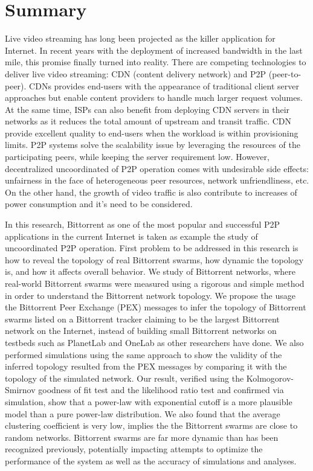 
\chapter*{Summary}

Live video streaming has long been projected as the killer application for Internet.  
In recent years with the deployment of increased bandwidth in the last mile, this promise finally turned into reality.
There are competing technologies to deliver live video streaming:  CDN (content delivery network) and P2P (peer-to-peer).
CDNs provides end-users with the appearance of traditional client server approaches but enable content providers to handle much larger request volumes.
At the same time, ISPs can also benefit from deploying CDN servers in their networks as it reduces the total amount of upstream and transit traffic. 
CDN provide excellent quality to end-users when the workload is within provisioning limits.
P2P systems solve the scalability issue by leveraging the resources of the participating peers, while keeping the server requirement low.
However, decentralized uncoordinated of P2P operation comes with undesirable side effects: unfairness in the face of heterogeneous peer resources, network unfriendliness, etc. 
On the other hand, the growth of video traffic is also contribute to increases of power consumption and it's need to be considered.

In this research, Bittorrent as one of the most popular and successful P2P applications in the current Internet is taken as example the study of uncoordinated P2P operation.
First problem to be addressed in this research is how to reveal the topology of real Bittorrent swarms, how dynamic the topology is, and how it affects overall behavior.
We study of Bittorrent networks, where real-world Bittorrent swarms were measured using a rigorous and simple method in order to understand the Bittorrent network topology. 
We propose the usage the Bittorrent Peer Exchange (PEX) messages to infer the topology of Bittorrent swarms listed on a Bittorrent tracker claiming to be the largest Bittorrent network on the Internet, instead of building small Bittorrent networks on testbeds such as PlanetLab and OneLab as other researchers have done. 
We also performed simulations using the same approach to show the validity of the inferred topology  resulted from the PEX messages by comparing it with the topology of the simulated network.
Our result, verified using the Kolmogorov-Smirnov goodness of fit test and the likelihood ratio test and confirmed via simulation, show that a power-law with exponential cutoff is a more plausible model than a pure power-law distribution.  
We also found that the average clustering coefficient is very low, implies the the Bittorrent swarms are close to random networks.  
Bittorrent swarms are far more dynamic than has been recognized previously, potentially impacting attempts to optimize the performance of the system as well as the accuracy of simulations and analyses. 

